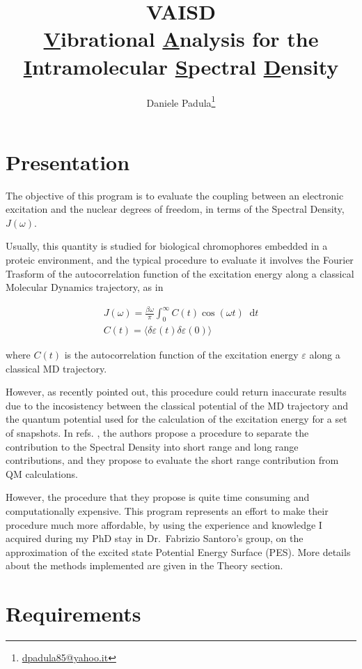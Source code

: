 \documentclass[a4paper]{article}
\title{VAISD \\ \underline{V}ibrational \underline{A}nalysis for the \underline{I}ntramolecular \underline{S}pectral \underline{D}ensity}
\author[1]{Daniele Padula\thanks{\href{mailto:dpadula85@yahoo.it}{dpadula85@yahoo.it}}}
\affil[1]{\textit{Department of Chemistry, University of Warwick, Gibbet Hill Rd, CV47AL Coventry, U.K.}}
\newcommand{\diff}{\mathop{}\!\mathrm{d}}
\begin{document}
\maketitle

\section{Presentation}

The objective of this program is to evaluate the coupling between an electronic excitation and the nuclear degrees of freedom, in terms of the Spectral Density, $J(\omega)$.

Usually, this quantity is studied for biological chromophores embedded in a proteic environment, and the typical procedure to evaluate it involves the Fourier Trasform of the autocorrelation function of the excitation energy along a classical Molecular Dynamics trajectory,\cite{Coker2016} as in

\begin{gather}
J(\omega) = \frac{\beta\omega}{\pi}\int_0^\infty C(t) \cos(\omega t) \diff t \\
C(t) = \langle \delta\varepsilon(t) \delta\varepsilon(0) \rangle
\end{gather}

where $C(t)$ is the autocorrelation function of the excitation energy $\varepsilon$ along a classical MD trajectory.

However, as recently pointed out,\cite{Coker2016} this procedure could return inaccurate results due to the incosistency between the classical potential of the MD trajectory and the quantum potential used for the calculation of the excitation energy for a set of snapshots.
In refs. , the authors propose a procedure to separate the contribution to the Spectral Density into short range and long range contributions, and they propose to evaluate the short range contribution from QM calculations.

However, the procedure that they propose is quite time consuming and computationally expensive. This program represents an effort to make their procedure much more affordable, by using the experience and knowledge I acquired during my PhD stay in Dr.~Fabrizio Santoro's group, on the approximation of the excited state Potential Energy Surface (PES). More details about the methods implemented are given in the Theory section.

\section{Requirements}
\end{document}
